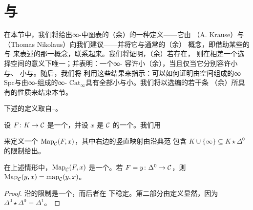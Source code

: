 \section{\trLimit{}与\trColimit{}}
\label{sec:limits-and-colimits}

在本节中，我们将给出∞-\trCategories{}中图表的（余）\trLimit{}的一种定义——它由%
\trKrause{}（A. Krause）与\trNikolaus{}（Thomas Nikolaus）向我们建议——并将它与通常的（余）%
\trLimit{}概念，即借助某些\trSliceCategory{}的\trInitialObject{}与%
\trTerminalObject{}来表述的那一概念，联系起来。我们将证明，（余）\trLimit{}若存在，
则在相差一个\trContractible{}选择空间的意义下唯一；并表明：一个∞-\trCategory{}%
容许小（余）\trLimit{}，当且仅当它分别容许小\trProduct{}与\trPullback{}、%
小\trCoproduct{}与\trPushout{}。随后，我们将
利用这些结果来指示：可以如何证明由空间组成的∞-\trCategory{}%
$\mathrm{Spc}$与由∞-\trCategories{}组成的∞-\trCategory{}%
$\mathrm{Cat}_{\infty}$具有全部小\trLimit{}与小\trColimit{}。我们将以选编的若干条
（余）\trLimit{}所具有的性质来结束本节。

下述\trColimit{}的定义取自\trKrause{}–\trNikolaus{}。

\begin{definition}\label{def:map-cone-space}
设 $F\colon K \to \mathcal{C}$ 是一个\trFunctor{}，并设 $x$ 是 $\mathcal{C}$ 的一个\trObject{}。我们用%
\trPullback{}%
\begin{center}
\end{center}
来定义一个\trSimplicialSet{} $\mathrm{Map}_{\mathcal{C}}(F, x)$，其中右边的竖直映射由沿典范
包含 $K \cup \{\infty\} \subseteq K \star \Delta^0$ 的限制给出。
\end{definition}

\begin{lemma}\label{lem:map-cone-kan}
在上述情形中，$\mathrm{Map}_{\mathcal{C}}(F, x)$ 是一个\trInfinityGroupoid{}。若
$F = y\colon \Delta^0 \to \mathcal{C}$，则
$\mathrm{Map}_{\mathcal{C}}(y, x) = \mathrm{map}_{\mathcal{C}}(y, x)$。
\end{lemma}

\begin{proof}
沿\trMonomorphism{}的限制是一个\trConservative{}\trInnerFibration{}，而后者在%
\trPullback{}下稳定。第二部分由定义显然，因为 $\Delta^0 \star \Delta^0 = \Delta^1$。
\end{proof}

